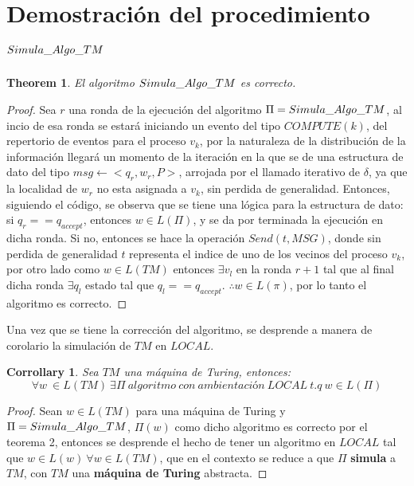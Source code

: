 \documentclass[10pt]{report}
\newtheorem{corrollary}{Corrollary}
\newtheorem{theorem}{Theorem}
\begin{document}
    \section{Demostración del procedimiento $Simula\char95Algo\char95TM$}\label{sec:demostración-del-procedimiento}
    \begin{theorem}
        El algoritmo $Simula\char95Algo\char95TM$ es correcto.
    \end{theorem}
    \begin{proof}
        Sea $r$ una ronda de la ejecución del algoritmo $\Pi=Simula\char95Algo\char95TM$,
        al incio de esa ronda se estará iniciando un evento del tipo $COMPUTE(k)$, del repertorio de eventos para el proceso
        $v_{k}$, por la naturaleza de la distribución de la información llegará un momento
        de la iteración en la que se de una estructura de dato del tipo $msg\gets <q_{r},w_{r},P>$, arrojada por el llamado iterativo de
        $\delta$, ya que la localidad de $w_{r}$ no esta asignada a $v_{k}$, sin perdida de generalidad.
        \newline
        Entonces, siguiendo el código, se observa que se tiene una lógica para la estructura de dato:
        \newline
        si $q_{r}==q_{accept}$, entonces $w\in L(\Pi)$, y se da por terminada la ejecución en dicha ronda.
        Si no, entonces se hace la operación $Send(t,MSG)$, donde sin perdida de generalidad $t$ representa el indice de uno de los vecinos
        del proceso $v_{k}$, por otro lado como $w\in L(TM)$ entonces $\exists v_{l}$ en la ronda $r+1$
        tal que al final dicha ronda $\exists q_{l}$ estado tal que $q_{l} == q_{accept}$.\newline
        $\therefore w\in L(\pi)$, por lo tanto el algoritmo es correcto.
        \newline
    \end{proof}
    Una vez que se tiene la corrección del algoritmo, se desprende a manera de corolario la
    simulación de $TM$ en $LOCAL$.
    \begin{corrollary}
        Sea $TM$ una máquina de Turing, entonces:
        \begin{equation}
            \forall w \  \in L(TM) \ \exists \Pi \ algoritmo \ con\ ambientación \ LOCAL\ t.q \ w \in L(\Pi)
        \end{equation}
    \end{corrollary}

    \begin{proof}
        Sean $w\in L(TM)$ para una máquina de Turing y  $\Pi =Simula\char95Algo\char95TM$, $\Pi(w)$ como dicho algoritmo es correcto por el teorema 2,
        entonces se desprende el hecho de tener un algoritmo  en $LOCAL$ tal que $w\in L(w) \ \forall w\in L(TM)$,
        que en el contexto se reduce a que $\Pi$ \textbf{simula} a $TM$, con $TM$ una \textbf{máquina de Turing} abstracta.
    \end{proof}
\end{document}
